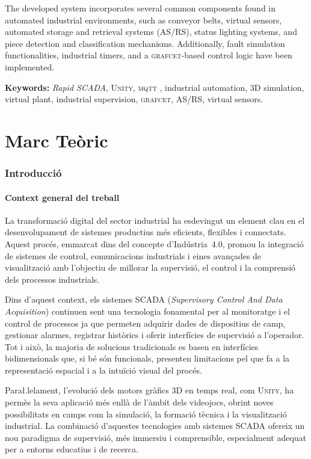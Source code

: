 \documentclass[a4paper,11pt,DIV=13,headings=normal,abstract=true,twoside=semi]{article}
\newcommand{\acro}[1]{\textsc{#1}}
\begin{document}
The developed system incorporates several common components found in automated industrial environments, such as conveyor belts, virtual sensors, automated storage and retrieval systems (\acro{AS/RS}), status lighting systems, and piece detection and classification mechanisms. Additionally, fault simulation functionalities, industrial timers, and a \acro{grafcet}-based control logic have been implemented.

\bigskip
\textbf{Keywords:} \emph{Rapid SCADA}, \acro{Unity}, \acro{mqtt} , industrial automation, 3D simulation, virtual plant, industrial supervision, \acro{grafcet}, \acro{AS/RS}, virtual sensors.
\newpage


\tableofcontents
\newpage
\listoffigures 
\listoftables
\cleardoublepage
\newpage

\part{ Marc Teòric}
\section{Introducció}

\subsection{Context general del treball}

La transformació digital del sector industrial ha esdevingut un element clau en el desenvolupament de sistemes productius més eficients, flexibles i connectats. Aquest procés, emmarcat dins del concepte d'Indústria~4.0, promou la integració de sistemes de control, comunicacions industrials i eines avançades de visualització amb l'objectiu de millorar la supervisió, el control i la comprensió dels processos industrials.

Dins d'aquest context, els sistemes \acro{SCADA} (\emph{Supervisory Control And Data Acquisition}) continuen sent una tecnologia fonamental per al monitoratge i el control de processos ja que permeten adquirir dades de dispositius de camp, gestionar alarmes, registrar històrics i oferir interfícies de supervisió a l'operador. Tot i això, la majoria de solucions tradicionals es basen en interfícies bidimensionals que, si bé són funcionals, presenten limitacions pel que fa a la representació espacial i a la intuïció visual del procés.

Para\l.lelament, l'evolució dels motors gràfics 3D en temps real, com \acro{Unity}, ha permès la seva aplicació més enllà de l'àmbit dels videojocs, obrint noves possibilitats en camps com la simulació, la formació tècnica i la visualització industrial. La combinació d'aquestes tecnologies amb sistemes \acro{SCADA} ofereix un nou paradigma de supervisió, més immersiu i comprensible, especialment adequat per a entorns educatius i de recerca.
\end{document}
